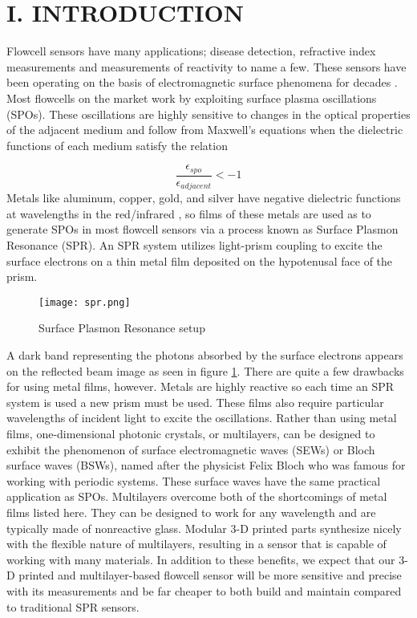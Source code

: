 \selectfont
{}
\section*{I. INTRODUCTION}
\begin{flushleft}
	\hspace{0.25in}
	Flowcell sensors have many applications; disease detection, refractive index measurements and measurements of reactivity to name a few. These sensors have been operating on the basis of electromagnetic surface phenomena for decades \cite{homola1999surface}. Most flowcells on the market work by exploiting surface plasma oscillations (SPOs). These oscillations are highly sensitive to changes in the optical properties of the adjacent medium and follow from Maxwell's equations when the dielectric functions of each medium satisfy the relation \cite{JLTROB:1}

	\[
		\frac{\epsilon_{spo}}{\epsilon_{adjacent}} < -1
	\]
	\hspace{0.25in}
	Metals like aluminum, copper, gold, and silver have negative dielectric functions at wavelengths in the red/infrared \cite{JLTROB:1}, so films of these metals are used as to generate SPOs in most flowcell sensors via a process known as Surface Plasmon Resonance (SPR). An SPR system utilizes light-prism coupling to excite the surface electrons on a thin metal film deposited on the hypotenusal face of the prism.
	\begin{figure}[h]
		\begin{center}
			\texttt{[image: spr.png]}
			\caption{Surface Plasmon Resonance setup}
			\label{fig:SPR}
		\end{center}
	\end{figure}
	A dark band representing the photons absorbed by the surface electrons appears on the reflected beam image as seen in figure \ref{fig:SPR}. There are quite a few drawbacks for using metal films, however. Metals are highly reactive so each time an SPR system is used a new prism must be used. These films also require particular wavelengths of incident light to excite the oscillations. Rather than using metal films, one-dimensional photonic crystals, or multilayers, can be designed to exhibit the phenomenon of surface electromagnetic waves (SEWs) or Bloch surface waves (BSWs), named after the physicist Felix Bloch who was famous for working with periodic systems. These surface waves have the same practical application as SPOs. Multilayers overcome both of the shortcomings of metal films listed here. They can be designed to work for any wavelength and are typically made of nonreactive glass. Modular 3-D printed parts synthesize nicely with the flexible nature of multilayers, resulting in a sensor that is capable of working with many materials. In addition to these benefits, we expect that our 3-D printed and multilayer-based flowcell sensor will be more sensitive and precise with its measurements and be far cheaper to both build and maintain compared to traditional SPR sensors.


\end{flushleft}
